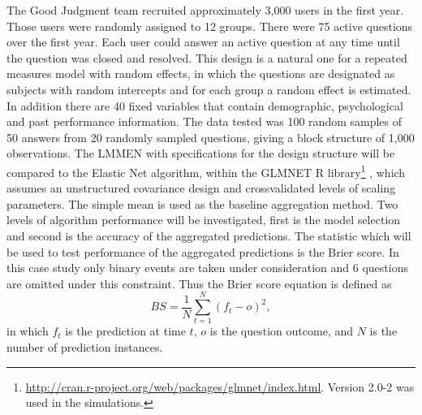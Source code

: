 \documentclass{article}
\begin{document}
The Good Judgment team recruited approximately 3,000 users in the first year. Those users were randomly assigned to 12 groups. There were 75 active questions  over the first year.  Each user could answer an active question at any time until the question was closed and resolved. This design is a natural one for a repeated measures model with random effects, in which the questions are designated as subjects with random intercepts and for each group a random effect is estimated. In addition there are 40 fixed variables that contain demographic, psychological and past performance information. The data tested was 100 random samples of 50 answers from 20 randomly sampled questions, giving a block structure of 1,000 observations.
%
    The LMMEN with specifications for the design structure will be compared to the Elastic Net algorithm, within the GLMNET R library\footnote{ \url{http://cran.r-project.org/web/packages/glmnet/index.html}. Version 2.0-2 was used in the simulations.} \cite{FHT2010}, which assumes an unstructured covariance design and crossvalidated levels of scaling parameters. The simple mean is used as the baseline aggregation method. Two levels of algorithm performance will be investigated, first is the model selection and second is the accuracy of the aggregated predictions. The statistic which will be used to test performance of the aggregated  predictions is the Brier score. In this case study only binary events are taken under consideration and 6 questions are omitted under this constraint. Thus the Brier score equation is defined as
\begin{equation*}
	BS=\frac{1}{N} \sum\limits_{t=1}^{N}(f_{t}-o)^2,
\end{equation*}
in which $f_t$ is the prediction at time $t$,  $o$ is the question outcome,  and $N$ is the number of prediction instances.
%
\end{document}
